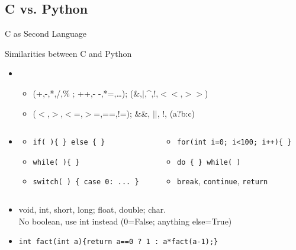\subsection{C vs. Python}
\begin{frame}{C as Second Language}
  \begin{block}{Similarities between C and Python}
    \begin{itemize}
    \item {}
      \begin{itemize}
      \item {} (+,-,*,/,\% ;  ++,- -,*=,\ldots);
         (\&,$|$,\^{},!,$<<$,$>>$)
      \item {} ($<$,$>$,$<$=,$>$=,==,!=);
       \&\&, $||$, !, (a?b:c)
      \end{itemize}
    \item {}\vspace{-.5\baselineskip}
      \begin{columns}
        \begin{column}{.5\linewidth}
          \begin{itemize}
          \item \texttt{if( )\{ \} else \{ \}}
          \item \texttt{while( )\{ \}}
          \item \texttt{switch( ) \{ case 0: ... \}}
          \end{itemize}
        \end{column}
        \begin{column}{.45\linewidth}
          \begin{itemize}
          \item \texttt{for(int i=0; i<100; i++)\{ \}}
          \item \texttt{do \{ \} while( )}
          \item \texttt{break}, \texttt{continue}, \texttt{return}
          \end{itemize}
        \end{column}
      \end{columns}\smallskip
    \item {} void, int, short, long; float,
      double; char.\\ {\small No boolean, use int instead  (0=False; anything
        else=True)}

    \item {} \texttt{\small int fact(int a)\{return a==0 ? 1 : a*fact(a-1);\}}
    \end{itemize}
  \end{block}\vspace{-\baselineskip}


\end{frame}
